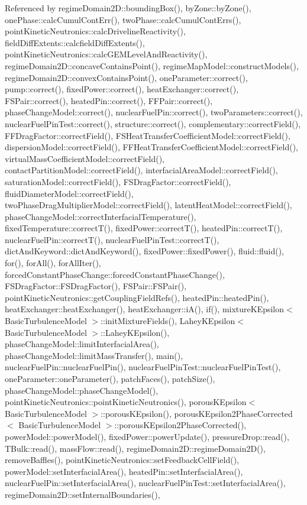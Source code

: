 Referenced by regime\+Domain2\+D\+::bounding\+Box(), by\+Zone\+::by\+Zone(), one\+Phase\+::calc\+Cumul\+Cont\+Err(), two\+Phase\+::calc\+Cumul\+Cont\+Errs(), point\+Kinetic\+Neutronics\+::calc\+Driveline\+Reactivity(), field\+Diff\+Extents\+::calcfield\+Diff\+Extents(), point\+Kinetic\+Neutronics\+::calc\+G\+E\+M\+Level\+And\+Reactivity(), regime\+Domain2\+D\+::concave\+Contains\+Point(), regime\+Map\+Model\+::construct\+Models(), regime\+Domain2\+D\+::convex\+Contains\+Point(), one\+Parameter\+::correct(), pump\+::correct(), fixed\+Power\+::correct(), heat\+Exchanger\+::correct(), F\+S\+Pair\+::correct(), heated\+Pin\+::correct(), F\+F\+Pair\+::correct(), phase\+Change\+Model\+::correct(), nuclear\+Fuel\+Pin\+::correct(), two\+Parameters\+::correct(), nuclear\+Fuel\+Pin\+Test\+::correct(), structure\+::correct(), complementary\+::correct\+Field(), F\+F\+Drag\+Factor\+::correct\+Field(), F\+S\+Heat\+Transfer\+Coefficient\+Model\+::correct\+Field(), dispersion\+Model\+::correct\+Field(), F\+F\+Heat\+Transfer\+Coefficient\+Model\+::correct\+Field(), virtual\+Mass\+Coefficient\+Model\+::correct\+Field(), contact\+Partition\+Model\+::correct\+Field(), interfacial\+Area\+Model\+::correct\+Field(), saturation\+Model\+::correct\+Field(), F\+S\+Drag\+Factor\+::correct\+Field(), fluid\+Diameter\+Model\+::correct\+Field(), two\+Phase\+Drag\+Multiplier\+Model\+::correct\+Field(), latent\+Heat\+Model\+::correct\+Field(), phase\+Change\+Model\+::correct\+Interfacial\+Temperature(), fixed\+Temperature\+::correct\+T(), fixed\+Power\+::correct\+T(), heated\+Pin\+::correct\+T(), nuclear\+Fuel\+Pin\+::correct\+T(), nuclear\+Fuel\+Pin\+Test\+::correct\+T(), dict\+And\+Keyword\+::dict\+And\+Keyword(), fixed\+Power\+::fixed\+Power(), fluid\+::fluid(), for(), for\+All(), for\+All\+Iter(), forced\+Constant\+Phase\+Change\+::forced\+Constant\+Phase\+Change(), F\+S\+Drag\+Factor\+::\+F\+S\+Drag\+Factor(), F\+S\+Pair\+::\+F\+S\+Pair(), point\+Kinetic\+Neutronics\+::get\+Coupling\+Field\+Refs(), heated\+Pin\+::heated\+Pin(), heat\+Exchanger\+::heat\+Exchanger(), heat\+Exchanger\+::i\+A(), if(), mixture\+K\+Epsilon$<$ Basic\+Turbulence\+Model $>$\+::init\+Mixture\+Fields(), Lahey\+K\+Epsilon$<$ Basic\+Turbulence\+Model $>$\+::\+Lahey\+K\+Epsilon(), phase\+Change\+Model\+::limit\+Interfacial\+Area(), phase\+Change\+Model\+::limit\+Mass\+Transfer(), main(), nuclear\+Fuel\+Pin\+::nuclear\+Fuel\+Pin(), nuclear\+Fuel\+Pin\+Test\+::nuclear\+Fuel\+Pin\+Test(), one\+Parameter\+::one\+Parameter(), patch\+Faces(), patch\+Size(), phase\+Change\+Model\+::phase\+Change\+Model(), point\+Kinetic\+Neutronics\+::point\+Kinetic\+Neutronics(), porous\+K\+Epsilon$<$ Basic\+Turbulence\+Model $>$\+::porous\+K\+Epsilon(), porous\+K\+Epsilon2\+Phase\+Corrected$<$ Basic\+Turbulence\+Model $>$\+::porous\+K\+Epsilon2\+Phase\+Corrected(), power\+Model\+::power\+Model(), fixed\+Power\+::power\+Update(), pressure\+Drop\+::read(), T\+Bulk\+::read(), mass\+Flow\+::read(), regime\+Domain2\+D\+::regime\+Domain2\+D(), remove\+Baffles(), point\+Kinetic\+Neutronics\+::set\+Feedback\+Cell\+Field(), power\+Model\+::set\+Interfacial\+Area(), heated\+Pin\+::set\+Interfacial\+Area(), nuclear\+Fuel\+Pin\+::set\+Interfacial\+Area(), nuclear\+Fuel\+Pin\+Test\+::set\+Interfacial\+Area(), regime\+Domain2\+D\+::set\+Internal\+Boundaries(), 